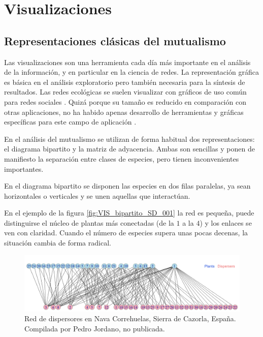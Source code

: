 
\chapter{Visualizaciones} %

\label{VISUALIZACIÓN} %


\section{Representaciones clásicas del mutualismo}

Las visualizaciones son una herramienta cada día más importante en el análisis de la información, y en particular en la ciencia de redes. La representación gráfica es básica en el análisis exploratorio pero también necesaria para la síntesis de resultados. Las redes ecológicas se suelen visualizar con gráficos de uso común para redes sociales \cite{freeman2012social}. Quizá porque su tamaño es reducido en comparación con otras aplicaciones, no ha habido apenas desarrollo de herramientas y gráficas específicas para este campo de aplicación \cite{yoon20043d, kazanci2007econet}.

En el análisis del mutualismo se utilizan de forma habitual dos representaciones: el diagrama bipartito y la matriz de adyacencia. Ambas  son sencillas y ponen de manifiesto la separación entre clases de especies, pero tienen inconvenientes importantes. 

En el diagrama bipartito se disponen las especies en dos filas paralelas, ya sean horizontales o verticales
y se unen aquellas que interactúan.


En el ejemplo de la figura \ref{fig:VIS_bipartito_SD_001} la red es pequeña, puede distinguirse el núcleo de plantas más conectadas (de la $1$ a la $4$) y los enlaces se ven con claridad. Cuando el número de especies supera unas pocas decenas, la situación cambia de forma radical.

\begin{figure}[h!]
\centering
\includegraphics[scale=0.4]{Figures/VIS_bipartito_SD_020.png}
\caption{Red de dispersores en Nava Correhuelas, Sierra de Cazorla, España. Compilada por Pedro Jordano, no publicada.}
\label{fig:VIS_bipartito_SD_020}
\end{figure}

